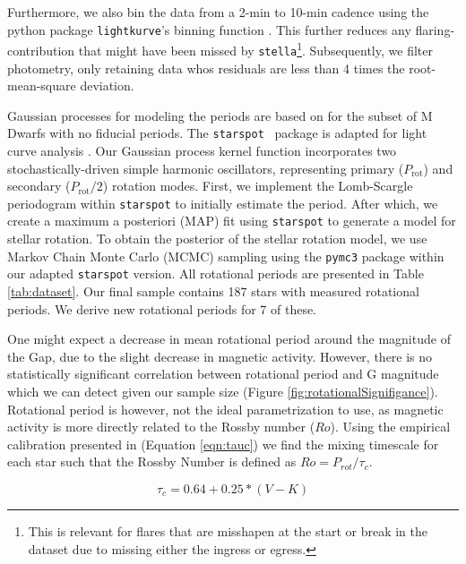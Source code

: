 Furthermore, we also bin the data from a 2-min to 10-min cadence using the
python package \texttt{lightkurve}'s binning function
\citep{LightkurveCollaborationLightkurve2018,GeertBarentsenKeplerGO2020}. This
further reduces any flaring-contribution that might have been missed by
\texttt{stella}\footnote{This is relevant for flares that are misshapen at the
start or break in the dataset due to missing either the ingress or egress.}.
Subsequently, we filter photometry, only retaining data whos residuals are
less than 4 times the root-mean-square deviation.  

Gaussian processes for modeling the periods are based on
\citet{AngusInferring2018} for the subset of M Dwarfs with no fiducial periods.
The \texttt{starspot} \ package is adapted for light curve analysis
\citep{AngusRuthAngus2021, Angus2023}. Our Gaussian process kernel function
incorporates two stochastically-driven simple harmonic oscillators,
representing primary ($P_\textrm{rot}$) and secondary ($P_\textrm{rot}/2$)
rotation modes. First, we implement the Lomb-Scargle periodogram within
\texttt{starspot} to initially estimate the period. After which, we create a
maximum a posteriori (MAP) fit using \texttt{starspot} to generate a model for
stellar rotation. To obtain the posterior of the stellar rotation model, we use
Markov Chain Monte Carlo (MCMC) sampling using the \texttt{pymc3} package
\citep{SalvatierProbabilistic2016} within our adapted \texttt{starspot}
version. All rotational periods are presented in Table \ref{tab:dataset}. Our
final sample contains 187 stars with measured rotational periods. We derive new
rotational periods for 7 of these. 



One might expect a decrease in mean rotational period around the magnitude of
the Gap, due to the slight decrease in magnetic activity. However, there is no
statistically significant correlation between rotational period and G
magnitude which we can detect given our sample size (Figure
\ref{fig:rotationalSignifigance}). Rotational period is however, not the ideal
parametrization to use, as magnetic activity is more directly related to the
Rossby number ($Ro$). Using the empirical calibration presented in
\citet{Wright2018} (Equation \ref{eqn:tauc}) we find the mixing timescale for
each star such that the Rossby Number is defined as $Ro = P_{rot}/\tau_{c}$.

\begin{equation}\label{eqn:tauc}
  \tau_{c} = 0.64 + 0.25 * (V-K)
\end{equation}

